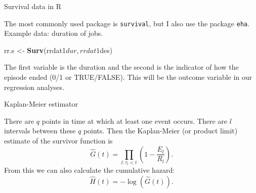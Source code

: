 \documentclass[10pt,ignorenonframetext,]{beamer}
\newenvironment{Shaded}{\begin{snugshade}}{\end{snugshade}}
\newcommand{\KeywordTok}[1]{\textcolor[rgb]{0.13,0.29,0.53}{\textbf{{#1}}}}
\newcommand{\StringTok}[1]{\textcolor[rgb]{0.31,0.60,0.02}{{#1}}}
\newcommand{\NormalTok}[1]{{#1}}
\begin{document}
\begin{frame}[fragile]{Survival data in R}

The most commonly used package is \texttt{survival}, but I also use the
package \texttt{eha}. Example data: duration of jobs.

\begin{Shaded}
\begin{Highlighting}[]
\NormalTok{rr.s <-}\StringTok{ }\KeywordTok{Surv}\NormalTok{(rrdat1$dur, rrdat1$des)}
\end{Highlighting}
\end{Shaded}

The first variable is the duration and the second is the indicator of
how the episode ended (0/1 or TRUE/FALSE). This will be the outcome
variable in our regression analyses.

\end{frame}

\begin{frame}{Kaplan-Meier estimator}

There are \(q\) points in time at which at least one event occurs. There
are \(l\) intervals between these \(q\) points. Then the Kaplan-Meier
(or product limit) estimate of the survivor function is \[
\widehat{G}(t) = \prod_{l:\tau_l<t} \left(1 - \frac{E_l}{R_l}\right).
\] From this we can also calculate the cumulative hazard: \[
\widehat{H}(t) = -\log\left(\widehat{G}(t)\right).
\]

\end{frame}
\end{document}

